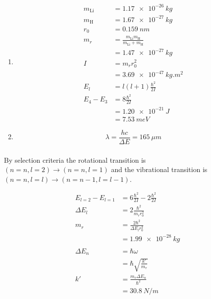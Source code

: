 \documentclass{article}
\begin{document}
\begin{enumerate}
  \item

        \begin{align*}
          m_\text{Li} & = \qty{1.17e-26}{kg}                                      \\
          m_\text{H}  & = \qty{1.67e-27}{kg}                                      \\
          r_0         & = \qty{0.159}{nm}                                         \\
          m_r         & = \frac{m_\text{Li} m_\text{H}}{m_\text{Li} + m_\text{H}} \\
                      & = \qty{1.47e-27}{kg}                                      \\
          I           & = m_r r_0^2                                               \\
                      & = \qty{3.69e-47}{kg.m^2}                                  \\
          E_l         & = l (l + 1) \frac{\hbar^2}{2 I}                           \\
          E_4 - E_3   & = 8 \frac{\hbar^2}{2 I}                                   \\
                      & = \qty{1.20e-21}{J}                                       \\
                      & = \qty{7.53}{meV}
        \end{align*}

  \item \[\lambda = \frac{h c}{\Delta E} = \qty{165}{\mu m}\]
\end{enumerate}

\setcounter{subsubsection}{12}
\subsubsection{}

By selection criteria the rotational transition is $(n = n, l = 2) \rightarrow (n = n, l = 1)$ and the vibrational transition is $(n = n, l = l) \rightarrow (n = n - 1, l = l - 1)$.

\begin{align*}
  E_{l = 2} - E_{l = 1} & = 6 \frac{\hbar^2}{2 I} - 2 \frac{\hbar^2}{2 I} \\
  \Delta E_l            & = 2 \frac{\hbar^2}{m_r r_0^2}                   \\
  m_r                   & = \frac{2 \hbar^2}{\Delta E_l r_0^2}            \\
                        & = \qty{1.99e-28}{kg}                            \\ \\
  \Delta E_n            & = \hbar \omega                                  \\
                        & = \hbar \sqrt{\frac{k'}{m_r}}                   \\
  k'                    & = \frac{m_r \Delta E_n}{\hbar^2}                \\
                        & = \qty{30.8}{N/m}
\end{align*}
\end{document}
